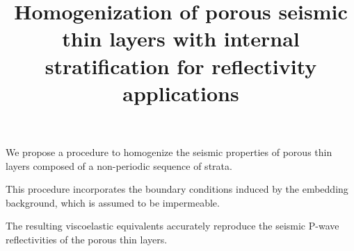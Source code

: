 \documentclass[draft]{agujournal2019}
\begin{document}

\title{Homogenization of porous seismic thin layers with internal stratification for reflectivity applications}
%
%






\begin{keypoints}
\item We propose a procedure to homogenize the seismic properties of porous thin layers composed of a non-periodic sequence of strata.
\item This procedure incorporates the boundary conditions induced by the embedding  background, which is assumed to be impermeable.
\item The resulting viscoelastic equivalents accurately reproduce the seismic P-wave reflectivities of the porous thin layers.

\end{keypoints}

\end{document}
